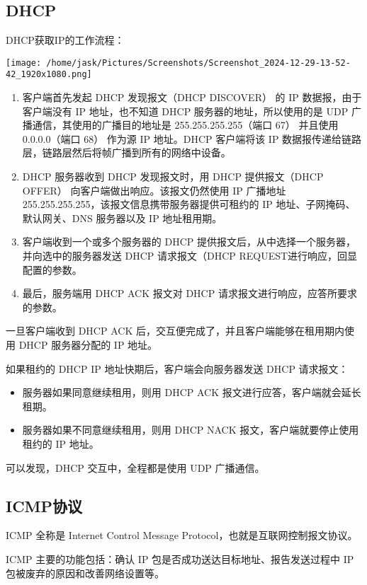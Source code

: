 \documentclass[11pt]{article}
\begin{document}
\subsection{DHCP}
\label{sec:org9de2a78}

DHCP获取IP的工作流程：
\begin{center}
\texttt{[image: /home/jask/Pictures/Screenshots/Screenshot\_2024-12-29-13-52-42\_1920x1080.png]}
\end{center}

\begin{enumerate}
\item 客户端首先发起 DHCP 发现报文（DHCP DISCOVER） 的 IP 数据报，由于客户端没有 IP 地址，也不知道 DHCP 服务器的地址，所以使用的是 UDP 广播通信，其使用的广播目的地址是 255.255.255.255（端口 67） 并且使用 0.0.0.0（端口 68） 作为源 IP 地址。DHCP 客户端将该 IP 数据报传递给链路层，链路层然后将帧广播到所有的网络中设备。
\item DHCP 服务器收到 DHCP 发现报文时，用 DHCP 提供报文（DHCP OFFER） 向客户端做出响应。该报文仍然使用 IP 广播地址 255.255.255.255，该报文信息携带服务器提供可租约的 IP 地址、子网掩码、默认网关、DNS 服务器以及 IP 地址租用期。
\item 客户端收到一个或多个服务器的 DHCP 提供报文后，从中选择一个服务器，并向选中的服务器发送 DHCP 请求报文（DHCP REQUEST进行响应，回显配置的参数。
\item 最后，服务端用 DHCP ACK 报文对 DHCP 请求报文进行响应，应答所要求的参数。
\end{enumerate}

一旦客户端收到 DHCP ACK 后，交互便完成了，并且客户端能够在租用期内使用 DHCP 服务器分配的 IP 地址。

如果租约的 DHCP IP 地址快期后，客户端会向服务器发送 DHCP 请求报文：
\begin{itemize}
\item 服务器如果同意继续租用，则用 DHCP ACK 报文进行应答，客户端就会延长租期。
\item 服务器如果不同意继续租用，则用 DHCP NACK 报文，客户端就要停止使用租约的 IP 地址。
\end{itemize}

可以发现，DHCP 交互中，全程都是使用 UDP 广播通信。
\subsection{ICMP协议}
\label{sec:orgd9d1b9d}
ICMP 全称是 Internet Control Message Protocol，也就是互联网控制报文协议。

ICMP 主要的功能包括：确认 IP 包是否成功送达目标地址、报告发送过程中 IP 包被废弃的原因和改善网络设置等。
\end{document}
